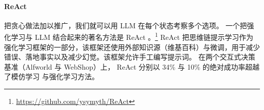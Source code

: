 \paragraph{ReAct}
把贪心做法加以推广，我们就可以用 LLM 在每个状态考察多个选项。
一个把强化学习与 LLM 结合起来的著名方法是 ReAct \citep{yao2022react}。\footnote{\url{https://github.com/ysymyth/ReAct}}
ReAct 把思维链提示学习作为强化学习框架的一部分，该框架还使用外部知识源（维基百科）与微调，用于减少错误、落地事实以及减少幻觉。该框架允许手工编写提示词。
%
%
在两个交互式决策
基准（Alfworld 与 WebShop）上，
ReAct 分别以 34\%
与 10\% 的绝对成功率超越了模仿学习
与强化学习方法。

